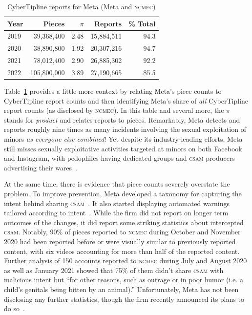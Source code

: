 \documentclass[nonacm,screen]{acmart}
\newcommand\V[1]{\textsc{\MakeLowercase{#1}}}
\begin{document}
\begin{table}[h!]
\centering\libertineLF
\caption{CyberTipline reports for Meta (Meta and \V{NCMEC})}
\label{tab:meta-pieces-and-reports}
\begin{tabular}{lrrrr}
\textbf{Year} & \textbf{Pieces} & $\pi$ & \textbf{Reports} & \textbf{\% Total} \\ \hline
2019 & 39,368,400 & 2.48 & 15,884,511 & 94.3 \\
2020 & 38,890,800 & 1.92 & 20,307,216 & 94.7 \\
2021 & 78,012,400 & 2.90 & 26,885,302 & 92.2 \\
2022 & 105,800,000 & 3.89 & 27,190,665 & 85.5 \\
\end{tabular}
\end{table}

Table~\ref{tab:meta-pieces-and-reports} provides a little more context by
relating Meta's piece counts to CyberTipline report counts and then identifying
Meta's share of \emph{all} CyberTipline report counts (as disclosed by
\V{NCMEC}). In this table and several more, the $\pi$ stands for \emph{product}
and relates reports to pieces. Remarkably, Meta detects and reports roughly nine
times as many incidents involving the sexual exploitation of minors \emph{as
everyone else combined}! Yet despite its industry-leading efforts, Meta still
misses sexually exploitative activities targeted at minors on both Facebook and
Instagram, with pedophiles having dedicated groups and \V{CSAM} producers
advertising their wares~\cite{HorwitzBlunt2023,HorwitzBlunt2023a}.

At the same time, there is evidence that piece counts severely overstate the
problem. To improve prevention, Meta developed a taxonomy for capturing the
intent behind sharing \V{CSAM}~\cite{BuckleyAndrusea2021}. It also started
displaying automated warnings tailored according to intent~\cite{Davis2021}.
While the firm did not report on longer term outcomes of the changes, it did
report some striking statistics about intercepted \V{CSAM}. Notably, 90\% of
pieces reported to \V{NCMEC} during October and November 2020 had been reported
before or were visually similar to previously reported content, with six videos
accounting for more than half of the reported content. Further analysis of 150
accounts reported to \V{NCMEC} during July and August 2020 as well as January
2021 showed that 75\% of them didn't share \V{CSAM} with malicious intent but
``for other reasons, such as outrage or in poor humor (i.e. a child's genitals
being bitten by an animal).'' Unfortunately, Meta has not been disclosing any
further statistics, though the firm recently announced its plans to do
so~\cite{Meta2023}.
\end{document}
